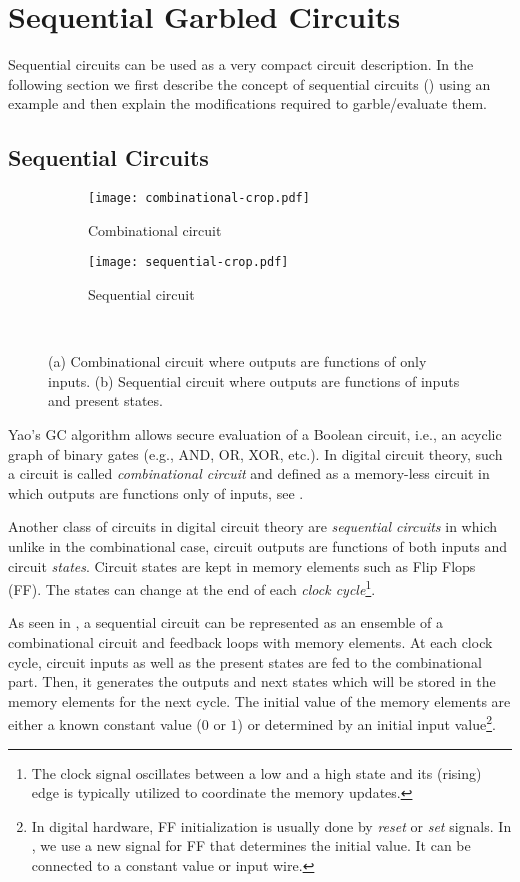 \chapter{Sequential Garbled Circuits}
Sequential circuits can be used as a very compact circuit description.
In the following section we first describe the concept of sequential circuits () using an example and then explain the modifications required to garble/evaluate them.

\section{Sequential Circuits}

\begin{figure}[ht]
    \centering
    \begin{subfigure}[t]{0.35\textwidth}
        \texttt{[image: combinational-crop.pdf]}
        \caption{Combinational circuit}\label{fig:combinational}
    \end{subfigure}
    \begin{subfigure}[t]{0.30\textwidth}
        \texttt{[image: sequential-crop.pdf]}
        \caption{Sequential circuit}\label{fig:sequential}
    \end{subfigure}\\
\vspace{10pt}
    \caption{(a) Combinational circuit where outputs are functions of only inputs.
(b) Sequential circuit where outputs are functions of inputs and present states.}
\end{figure}

Yao's GC algorithm allows secure evaluation of a Boolean circuit, i.e., an acyclic graph of binary gates (e.g., AND, OR, XOR, etc.).
In digital circuit theory, such a circuit is called \emph{combinational circuit} and defined as a memory-less circuit in which outputs are functions only of inputs, see .

Another class of circuits in digital circuit theory are \emph{sequential circuits} in which unlike in the combinational case, circuit outputs are functions of both inputs and circuit \emph{states}.
Circuit states are kept in memory elements such as Flip Flops (FF).
The states can change at the end of each \emph{clock cycle}\footnote{The clock signal oscillates between a low and a high state and its (rising) edge is typically utilized to coordinate the memory updates.}.

As seen in , a sequential circuit can be represented as an ensemble of a combinational circuit and feedback loops with memory elements.
At each clock cycle, circuit inputs as well as the present states are fed to the combinational part.
Then, it generates the outputs and next states which will be stored in the memory elements for the next cycle.
The initial value of the memory elements are either a known constant value ($0$ or $1$) or determined by an initial input value\footnote{In digital hardware, FF initialization is usually done by \emph{reset} or \emph{set} signals.
In \sys{}, we use a new signal for FF that determines the initial value.
It can be connected to a constant value or input wire.}.

